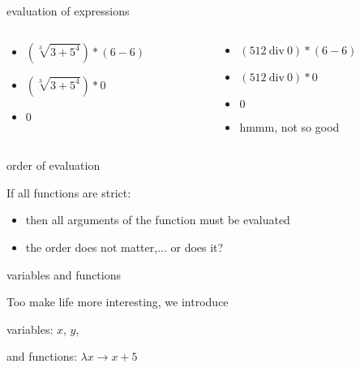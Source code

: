 \begin{frame}{evaluation of expressions}
\begin{columns}
 \begin{column}{0.5\linewidth}
  \begin{itemize}
   \pause \item $(\sqrt[3]{3 + 5^4}) * (6 - 6)$
   \pause \item $(\sqrt[3]{3 + 5^4}) * 0$
   \pause \item $0$
  \end{itemize}   
 \end{column}
 \begin{column}{0.5\linewidth}
  \begin{itemize}
   \pause \item $(512\ \mathrm{div}\ 0) * (6 - 6)$
   \pause \item $(512\ \mathrm{div}\ 0) * 0$
   \pause \item $0$
   \pause \item hmmm, not so good
  \end{itemize}   
 \end{column}
\end{columns}
\end{frame}

\begin{frame}{order of evaluation}

\vspace{20pt}\hspace{60pt}\parbox[l][60pt][l]{300pt}{If all functions are strict:
\begin{itemize}
\pause \item then all arguments of the function must be evaluated
\pause \item the order does not matter\pause ,... or does it?
\end{itemize}}

\end{frame}


\begin{frame}{variables and functions}


Too make life more interesting, we introduce 

\vspace{10pt}\hspace{40pt}variables: $x$, $y$, 

\vspace{10pt}\hspace{40pt}and functions: $\lambda x \rightarrow x+5$

\pause

\vspace{20pt}{\em Most often written $\lambda x.x+5$ but we will use $\rightarrow$.}

\pause

\vspace{20pt}{\em So far, functions do not have names.}

\end{frame}


